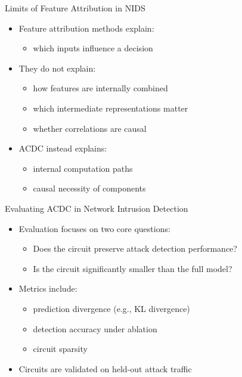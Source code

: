 \documentclass{beamer}
\begin{document}
	\begin{frame}{Limits of Feature Attribution in NIDS}
		\begin{itemize}
			\item Feature attribution methods explain:
			\begin{itemize}
				\item which inputs influence a decision
			\end{itemize}
			\item They do not explain:
			\begin{itemize}
				\item how features are internally combined
				\item which intermediate representations matter
				\item whether correlations are causal
			\end{itemize}
			\item ACDC instead explains:
			\begin{itemize}
				\item internal computation paths
				\item causal necessity of components
			\end{itemize}
		\end{itemize}
	\end{frame}
	
	\begin{frame}{Evaluating ACDC in Network Intrusion Detection}
		\begin{itemize}
			\item Evaluation focuses on two core questions:
			\begin{itemize}
				\item Does the circuit preserve attack detection performance?
				\item Is the circuit significantly smaller than the full model?
			\end{itemize}
			\item Metrics include:
			\begin{itemize}
				\item prediction divergence (e.g., KL divergence)
				\item detection accuracy under ablation
				\item circuit sparsity
			\end{itemize}
			\item Circuits are validated on held-out attack traffic
		\end{itemize}
	\end{frame}
	
\end{document}
